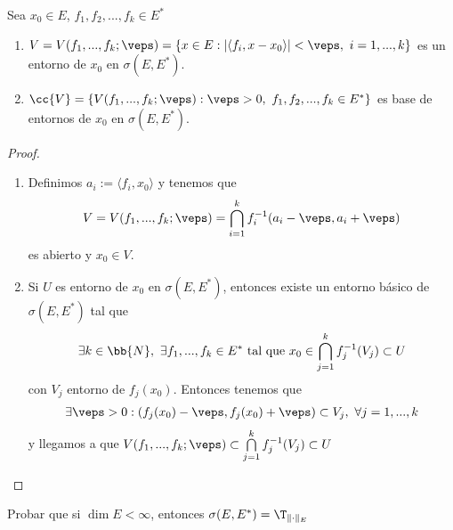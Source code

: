 \begin{prop}
    Sea $x_0\in E$, $f_1,f_2,...,f_k\in E^*$
    \begin{enumerate}
        \item $V=V(f_1,...,f_k ; \veps) = \{x\in E : |\langle f_i,x-x_0\rangle | <\veps,\ i=1,...,k\}$ es un entorno de $x_0$ en $\sigma(E, E^*)$.
        \item $\cc{V} = \{V(f_1,...,f_k;\veps) : \veps >0,\ f_1,f_2,...,f_k\in E^*\}$ es base de entornos de $x_0$ en $\sigma(E, E^*)$.
    \end{enumerate}
    \begin{proof}\
        \begin{enumerate}
            \item Definimos $a_i:=\langle f_i,x_0\rangle$ y tenemos que
            \begin{gather*}
                V=V(f_1,...,f_k;\veps) = \bigcap\limits_{i=1}^{k} f_i^{-1}(a_i-\veps, a_i+\veps)
            \end{gather*}
            es abierto y $x_0 \in V$.

            \item Si $U$ es entorno de $x_0$ en $\sigma(E, E^*)$, entonces existe un entorno básico de $\sigma(E,E^*)$ tal que
            \begin{gather*}
                \exists k\in \bb{N},\ \exists f_1,...,f_k\in E^* \text{ tal que } x_0\in \bigcap\limits_{j=1}^k f_j^{-1}(V_j) \subset U
            \end{gather*}
            con $V_j$ entorno de $f_j(x_0)$. Entonces tenemos que 
            \begin{gather*}
                \exists \veps >0 : (f_j(x_0)-\veps, f_j(x_0)+\veps)\subset V_j,\ \forall j = 1,...,k
            \end{gather*}
            y llegamos a que $V(f_1,...,f_k;\veps) \subset \bigcap\limits_{j=1}^k f_j^{-1} (V_j)\subset U$
        \end{enumerate}
    \end{proof}
\end{prop}

\begin{ejercicio}
    Probar que si $\dim E <\infty$, entonces $\sigma(E,E^*)=\T_{\|\cdot\|_E}$
\end{ejercicio}

